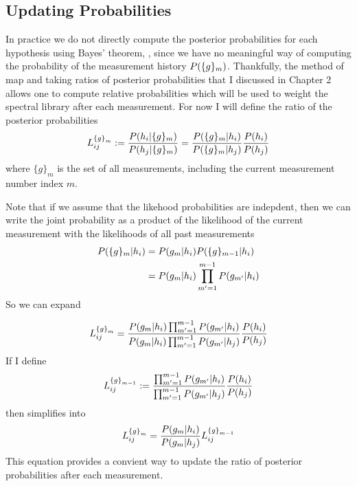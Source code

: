 \subsection{Updating Probabilities}\label{ssec:updatingProbabilities}

In practice we do not directly compute the posterior probabilities for each hypothesis using Bayes' theorem, , since we have no meaningful way of computing the probability of the measurement history $\prob{ \{g\}_m }$. Thankfully, the method of \acrfull{map} and taking ratios of posterior probabilities that I discussed in Chapter 2 allows one to compute relative probabilities which will be used to weight the spectral library after each measurement. For now I will define the ratio of the posterior probabilities
%
\begin{equation}
	  L_{ij}^{\left\{ g \right\}_m} := \pr{h_i | \{g\}_{m} }{h_j | \{g\}_{m} } = \pr{ \{g\}_{m}|h_i }{ \{g\}_{m}|h_j} \pr{h_i}{h_j}
	  \label{eq:initRatio1}
\end{equation}
%
where $\{g\}_{m}$ is the set of all measurements, including the current measurement number index $m$.


Note that if we assume that the likehood probabilities are indepdent, then we can write the joint probability as a product of the likelihood of the current measurement with the likelihoods of all past measurements
%
\begin{align}
	\prob{\{g\}_m|h_i} &= \prob{g_m|h_i} \prob{\{g\}_{m-1}|h_i} \notag \\
							&= \prob{g_m|h_i} \prod_{m'=1}^{m-1} \prob{g_{m'}|h_i}
\end{align}
So we can expand  

\begin{equation}
	  L_{ij}^{\left\{ g \right\}_m} =  \frac{ \prob{g_m|h_i} \prod_{m'=1}^{m-1} \prob{g_{m'}|h_i} }{ \prob{g_m|h_i} \prod_{m'=1}^{m-1} \prob{g_{m'}|h_j}} \pr{h_i}{h_j}
	  \label{eq:initRatio2}
\end{equation}
%
If I define
%
\begin{equation}
L_{ij}^{\left\{ g \right\}_{m-1}} := \frac{ \prod_{m'=1}^{m-1} \prob{g_{m'}|h_i} }{ \prod_{m'=1}^{m-1} \prob{g_{m'}|h_j}} \pr{h_i}{h_j}
\end{equation}
%
then  simplifies into
%
\begin{equation}
	  L_{ij}^{\left\{ g \right\}_m} =  \frac{ \prob{g_m| h_i} } { \prob{g_m| h_j} } L_{ij}^{\left\{ g \right\}_{m-1}}
	  \label{eq:initRatio3}
\end{equation}
%
This equation provides a convient way to update the ratio of posterior probabilities after each measurement.

